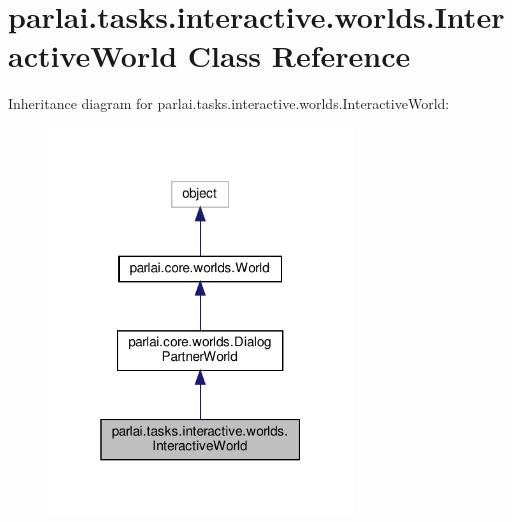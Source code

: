 \hypertarget{classparlai_1_1tasks_1_1interactive_1_1worlds_1_1InteractiveWorld}{}\section{parlai.\+tasks.\+interactive.\+worlds.\+Interactive\+World Class Reference}
\label{classparlai_1_1tasks_1_1interactive_1_1worlds_1_1InteractiveWorld}


Inheritance diagram for parlai.\+tasks.\+interactive.\+worlds.\+Interactive\+World\+:
\nopagebreak
\begin{figure}[H]
\begin{center}
\leavevmode
\includegraphics[width=229pt]{d4/dba/classparlai_1_1tasks_1_1interactive_1_1worlds_1_1InteractiveWorld__inherit__graph}
\end{center}
\end{figure}


